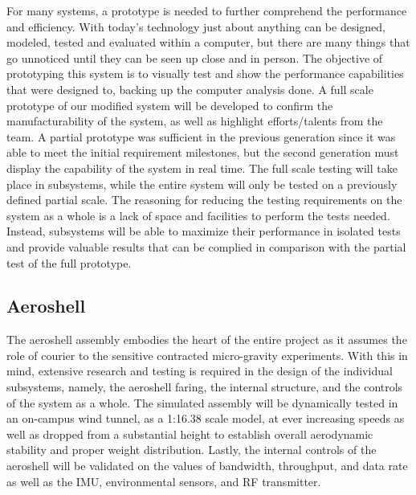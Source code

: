 \indent\indent For many systems, a prototype is needed to further comprehend the performance and efficiency. With today's technology just about anything can be designed, modeled, tested and evaluated within a computer, but there are many things that go unnoticed until they can be seen up close and in person. The objective of prototyping this system is to visually test and show the performance capabilities that were designed to, backing up the computer analysis done. A full scale prototype of our modified system will be developed to confirm the manufacturability of the system, as well as highlight efforts/talents from the team. A partial prototype was sufficient in the previous generation since it was able to meet the initial requirement milestones, but the second generation must display the capability of the system in real time. The full scale testing will take place in subsystems, while the entire system will only be tested on a previously defined partial scale. The reasoning for reducing the testing requirements on the system as a whole is a lack of space and facilities to perform the tests needed. Instead, subsystems will be able to maximize their performance in isolated tests and provide valuable results that can be complied in comparison with the partial test of the full prototype. 


\subsection{Aeroshell}

\indent\indent The aeroshell assembly embodies the heart of the entire project as it assumes the role of courier to the sensitive contracted micro-gravity experiments. With this in mind, extensive research and testing is required in the design of the individual subsystems, namely, the aeroshell faring, the internal structure, and the controls of the system as a whole. The simulated assembly will be dynamically tested in an on-campus wind tunnel, as a 1:16.38 scale model, at ever increasing speeds as well as dropped from a substantial height to establish overall aerodynamic stability and proper weight distribution. Lastly, the internal controls of the aeroshell will be validated on the values of bandwidth, throughput, and data rate as well as the IMU, environmental sensors, and RF transmitter. 




